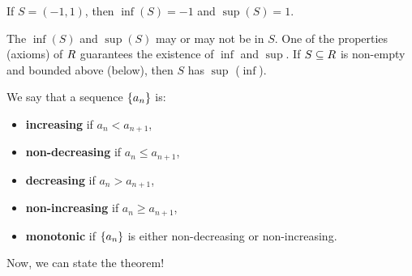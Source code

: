 \begin{Example}{}{}
    If $ S=(-1,1) $, then $ \inf(S)=-1 $ and $ \sup(S)=1 $.
\end{Example}
\begin{Remark}{}{}
    The $ \inf(S) $ and $ \sup(S) $ may or may not be in $ S $.
    One of the properties (axioms) of $ \relax{R} $ guarantees the existence
    of $ \inf $ and $ \sup $. If $ S\subseteq \relax{R} $
    is non-empty and bounded above (below), then $ S $ has
    $ \sup $ ($ \inf $).
\end{Remark}
\begin{Definition}{}{}
    We say that a sequence $ \{a_n\} $ is:
    \begin{itemize}
        \item \textbf{increasing} if $ a_n<a_{n+1} $,
        \item \textbf{non-decreasing} if $ a_n\le a_{n+1} $,
        \item \textbf{decreasing} if $ a_n>a_{n+1} $,
        \item \textbf{non-increasing} if $ a_n\ge a_{n+1} $,
        \item \textbf{monotonic} if $ \{a_n\} $ is either
              non-decreasing or non-increasing.
    \end{itemize}
\end{Definition}
Now, we can state the theorem!
